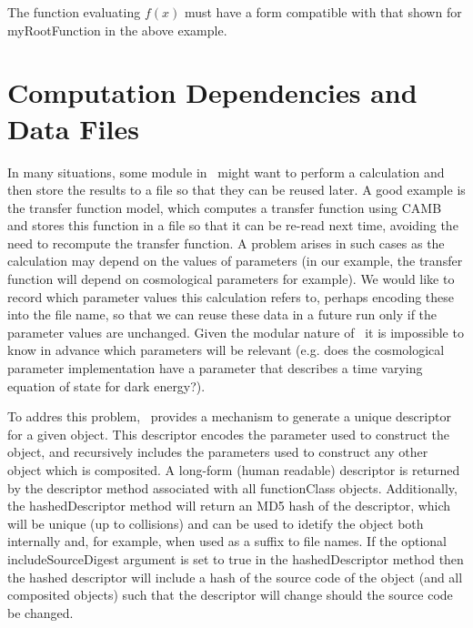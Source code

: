 The function evaluating $f(x)$ must have a form compatible with that shown for {\normalfont \ttfamily myRootFunction} in the above example.

\section{Computation Dependencies and Data Files}\label{sec:codeUniqueLabels}

In many situations, some module in \glc\ might want to perform a calculation and then store the results to a file so that they can be reused later. A good example is the  transfer function model, which computes a transfer function using {\normalfont \scshape CAMB} and stores this function in a file so that it can be re-read next time, avoiding the need to recompute the transfer function. A problem arises in such cases as the calculation may depend on the values of parameters (in our example, the transfer function will depend on cosmological parameters for example). We would like to record which parameter values this calculation refers to, perhaps encoding these into the file name, so that we can reuse these data in a future run only if the parameter values are unchanged. Given the modular nature of \glc\ it is impossible to know in advance which parameters will be relevant (e.g. does the cosmological parameter implementation have a parameter that describes a time varying equation of state for dark energy?). 

To addres this problem, \glc\ provides a mechanism to generate a unique descriptor for a given object. This descriptor encodes the parameter used to construct the object, and recursively includes the parameters used to construct any other object which is composited. A long-form (human readable) descriptor is returned by the {\normalfont \ttfamily descriptor} method associated with all {\normalfont \ttfamily functionClass} objects. Additionally, the {\normalfont \ttfamily hashedDescriptor} method will return an MD5 hash of the descriptor, which will be unique (up to collisions) and can be used to idetify the object both internally and, for example, when used as a suffix to file names. If the optional {\normalfont \ttfamily includeSourceDigest} argument is set to true in the {\normalfont \ttfamily hashedDescriptor} method then the hashed descriptor will include a hash of the source code of the object (and all composited objects) such that the descriptor will change should the source code be changed.


